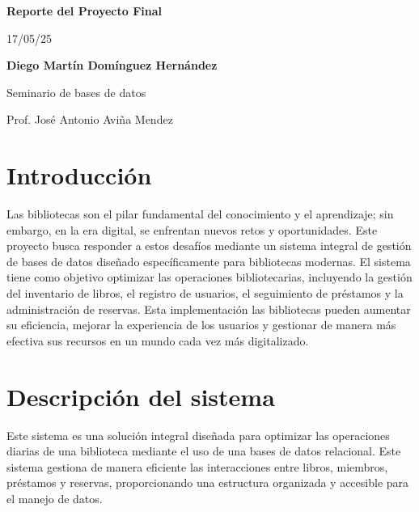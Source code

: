 \documentclass[12pt, a4paper]{article}
\begin{document}
\begin{titlepage}
\end{titlepage}

\begin{titlepage}
\begin{center}
 {\Huge\bfseries Reporte del Proyecto Final\\}
 \vspace{1cm}

 {\huge 17/05/25\\}
 \vspace{2cm}

 {\Large\bfseries Diego Martín Domínguez Hernández}\\[5pt]
 \vspace{2cm}

 {\Large Seminario de bases de datos}\\[5pt]
 \vspace{2cm}

 {\Large Prof. José Antonio Aviña Mendez}\\[5pt]
\end{center}
\end{titlepage}

\newpage
\tableofcontents
\newpage

\section{Introducción}
Las bibliotecas son el pilar fundamental del conocimiento y el aprendizaje; sin embargo, en la era digital, se enfrentan nuevos retos y oportunidades. Este proyecto busca responder a estos desafíos mediante un sistema integral de gestión de bases de datos diseñado específicamente para bibliotecas modernas. El sistema tiene como objetivo optimizar las operaciones bibliotecarias, incluyendo la gestión del inventario de libros, el registro de usuarios, el seguimiento de préstamos y la administración de reservas. Esta implementación las bibliotecas pueden aumentar su eficiencia, mejorar la experiencia de los usuarios y gestionar de manera más efectiva sus recursos en un mundo cada vez más digitalizado.

\section{Descripción del sistema}
Este sistema es una solución integral diseñada para optimizar las operaciones diarias de una biblioteca mediante el uso de una bases de datos relacional. Este sistema gestiona de manera eficiente las interacciones entre libros, miembros, préstamos y reservas, proporcionando una estructura organizada y accesible para el manejo de datos.
\end{document}
